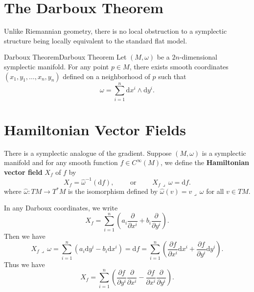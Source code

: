 \documentclass[../main.tex]{subfiles}
\begin{document}
\section{The Darboux Theorem}
Unlike Riemannian geometry, there is no local obstruction to a symplectic structure being locally equivalent to the standard flat model.

\begin{theorem}{Darboux Theorem}{Darboux Theorem}
  Let $(M, \omega)$ be a $2n$-dimensional symplectic manifold. For any point $p\in M$, there exists smooth coordinates $(x_1, y_1, \dots, x_n, y_n)$ defined on a neighborhood of $p$ such that
  \begin{equation}
    \omega = \sum_{i=1}^n \mathrm{d} x^i \wedge \mathrm{d} y^i.
  \end{equation}
\end{theorem}

\section{Hamiltonian Vector Fields}
There is a symplectic analogue of the gradient. Suppose $(M, \omega)$ is a symplectic manifold and for any smooth function $f \in C^\infty(M)$, we define the \textbf{Hamiltonian vector field} $X_f$ of $f$ by
\begin{equation}
  X_f = \hat{\omega}^{-1}(\mathrm{d} f), \qquad \text{ or } \qquad X_f \lrcorner \, \omega = \mathrm{d} f.
\end{equation}
where $\hat{\omega}: TM \to T^* M$ is the isomorphism defined by $\hat{\omega}(v) = v \lrcorner \, \omega$ for all $v\in TM$.

In any Darboux coordinates, we write
\begin{equation*}
  X_f = \sum_{i=1}^n \left( a_i \frac{\partial}{\partial x^i} + b_i \frac{\partial}{\partial y^i} \right).
\end{equation*}
Then we have
\begin{equation*}
  X_f \lrcorner \, \omega = \sum_{i=1}^n (a_i \mathrm{d} y^i - b_i \mathrm{d} x^i) = \mathrm{d} f = \sum_{i=1}^n \left( \frac{\partial f}{\partial x^i} \mathrm{d} x^i + \frac{\partial f}{\partial y^i} \mathrm{d} y^i \right).
\end{equation*}
Thus we have
\begin{equation}
  X_f = \sum_{i=1}^n \left( \frac{\partial f}{\partial y^i} \frac{\partial}{\partial x^i} - \frac{\partial f}{\partial x^i} \frac{\partial}{\partial y^i} \right).
\end{equation}
\end{document}
